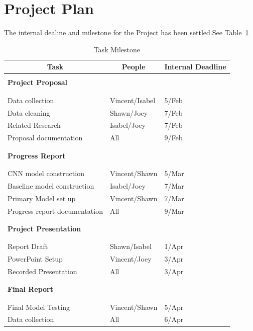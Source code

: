 \documentclass{article} %
\begin{document}
\section{Project Plan}
The internal dealine and milestone for the Project has been settled.See Table~\ref{sample-table}

\begin{table}[t]
\caption{Task Milestone}
\label{sample-table}
\begin{center}
\begin{tabular}{lll}
\multicolumn{1}{c}{\bf Task}  &\multicolumn{1}{c}{\bf People} &\multicolumn{1}{c}{\bf Internal Deadline} 
\\ \hline \\
\textbf{Project Proposal}       \\
\\ \hline \\
Data collection         &Vincent/Isabel  &5/Feb \\
Data cleaning           &Shawn/Joey      &7/Feb \\
Related-Research        &Isabel/Joey     &7/Feb \\
Proposal documentation  &All             &9/Feb \\
\\ \hline \\
\textbf{Progress Report}       \\
\\ \hline \\
CNN model construction         &Vincent/Shawn  &5/Mar \\
Baseline model construction       &Isabel/Joey  &7/Mar \\
Primary Model set up        &Vincent/Shawn  &7/Mar \\
Progress report documentation        &All  &9/Mar \\
\\ \hline \\
\textbf{Project Presentation}       \\
\\ \hline \\
Report Draft         &Shawn/Isabel  &1/Apr \\
PowerPoint Setup        &Vincent/Joey  &3/Apr \\
Recorded Presentation       &All  &3/Apr \\
\\ \hline \\
\textbf{Final Report}       \\
\\ \hline \\
Final Model Testing        &Vincent/Shawn  &5/Apr \\
Data collection         &All  &6/Apr \\
\end{tabular}
\end{center}
\end{table}
\end{document}
